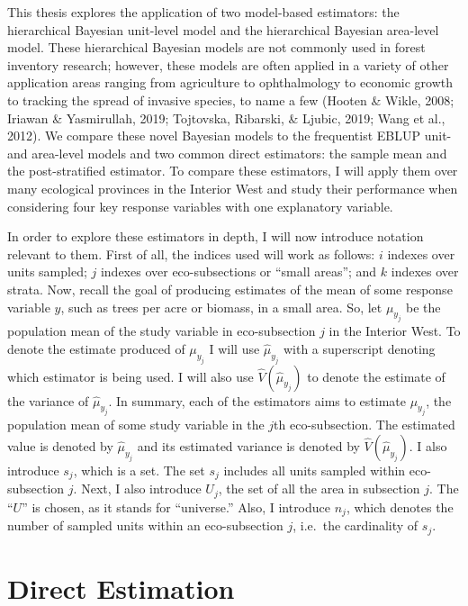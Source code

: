 \documentclass[12pt,twoside]{reedthesis}
\begin{document}
This thesis explores the application of two model-based estimators: the hierarchical Bayesian unit-level model and the hierarchical Bayesian area-level model. These hierarchical Bayesian models are not commonly used in forest inventory research; however, these models are often applied in a variety of other application areas ranging from agriculture to ophthalmology to economic growth to tracking the spread of invasive species, to name a few (Hooten \& Wikle, 2008; Iriawan \& Yasmirullah, 2019; Tojtovska, Ribarski, \& Ljubic, 2019; Wang et al., 2012). We compare these novel Bayesian models to the frequentist EBLUP unit- and area-level models and two common direct estimators: the sample mean and the post-stratified estimator. To compare these estimators, I will apply them over many ecological provinces in the Interior West and study their performance when considering four key response variables with one explanatory variable.

In order to explore these estimators in depth, I will now introduce notation relevant to them. First of all, the indices used will work as follows: \(i\) indexes over units sampled; \(j\) indexes over eco-subsections or ``small areas''; and \(k\) indexes over strata. Now, recall the goal of producing estimates of the mean of some response variable \(y\), such as trees per acre or biomass, in a small area. So, let \(\mu_{y_j}\) be the population mean of the study variable in eco-subsection \(j\) in the Interior West. To denote the estimate produced of \(\mu_{y_j}\) I will use \(\hat\mu_{y_j}\) with a superscript denoting which estimator is being used. I will also use \(\hat V(\hat\mu_{y_j})\) to denote the estimate of the variance of \(\hat\mu_{y_j}\). In summary, each of the estimators aims to estimate \(\mu_{y_j}\), the population mean of some study variable in the \(j\)th eco-subsection. The estimated value is denoted by \(\hat\mu_{y_j}\) and its estimated variance is denoted by \(\hat V(\hat\mu_{y_j})\). I also introduce \(s_j\), which is a set. The set \(s_j\) includes all units sampled within eco-subsection \(j\). Next, I also introduce \(U_j\), the set of all the area in subsection \(j\). The ``\(U\)'' is chosen, as it stands for ``universe.'' Also, I introduce \(n_j\), which denotes the number of sampled units within an eco-subsection \(j\), i.e.~the cardinality of \(s_j\).

\hypertarget{direct-estimation}{%
\section{Direct Estimation}\label{direct-estimation}}
\end{document}
